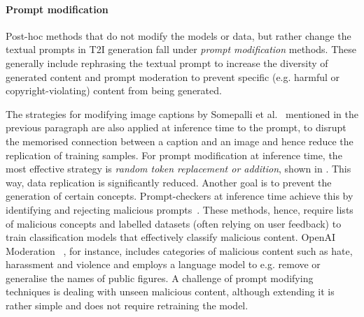 \documentclass[conference,table]{IEEEtran}
\begin{document}
\paragraph{Prompt modification}\label{sec:mitigation-sanitising-prompt}
Post-hoc methods that do not modify the models or data, but rather change the textual prompts in T2I generation fall under \textit{prompt modification} methods.
These generally include rephrasing the textual prompt to increase the diversity of generated content and prompt moderation to prevent specific (e.g. harmful or copyright-violating) content from being generated. 

The strategies for modifying image captions by Somepalli et al.~\cite{somepalli_understanding_2023} mentioned in the previous paragraph are also applied at inference time to the prompt, to disrupt the memorised connection between a caption and an image and hence reduce the replication of training samples. 
For prompt modification at inference time, the most effective strategy is \textit{random token replacement or addition}, shown in .
This way, data replication is significantly reduced. 
Another goal is to prevent the generation of certain concepts.
Prompt-checkers at inference time achieve this by identifying and rejecting malicious prompts~\cite{hanu_detoxify_2020,noauthor_openai_2023}.
These methods, hence, require lists of malicious concepts and labelled datasets (often relying on user feedback) to train classification models that effectively classify malicious content. 
OpenAI Moderation~\cite{noauthor_openai_2023}
, for instance, includes categories of malicious content such as hate, harassment and violence and employs a language model to e.g. remove or generalise the names of public figures. 
A challenge of prompt modifying techniques is dealing with unseen malicious content, although extending it is rather simple and does not require retraining the model.
 
\end{document}
